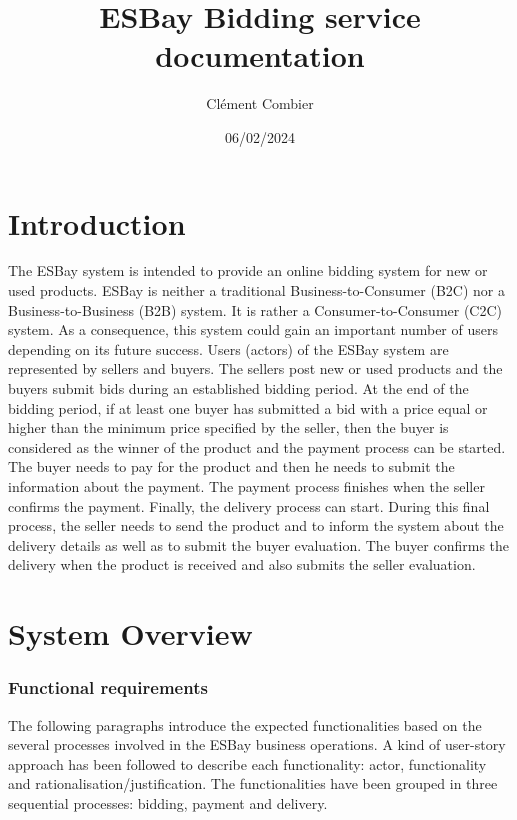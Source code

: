 \documentclass[12pt]{article}
\title{ESBay Bidding service documentation}
\author{Clément Combier}
\date{06/02/2024}
\begin{document}
\maketitle

\section{Introduction}
The ESBay system is intended to provide an online bidding system for new or used products. ESBay is
neither a traditional Business-to-Consumer (B2C) nor a Business-to-Business (B2B) system. It is rather a
Consumer-to-Consumer (C2C) system. As a consequence, this system could gain an important number of users
depending on its future success. Users (actors) of the ESBay system are represented by sellers and buyers. The
sellers post new or used products and the buyers submit bids during an established bidding period. At the end of
the bidding period, if at least one buyer has submitted a bid with a price equal or higher than the minimum price
specified by the seller, then the buyer is considered as the winner of the product and the payment process can be
started. The buyer needs to pay for the product and then he needs to submit the information about the payment.
The payment process finishes when the seller confirms the payment. Finally, the delivery process can start.
During this final process, the seller needs to send the product and to inform the system about the delivery details
as well as to submit the buyer evaluation. The buyer confirms the delivery when the product is received and also
submits the seller evaluation.

\section{System Overview}
\subsubsection{Functional requirements}

The following paragraphs introduce the expected functionalities based on the several processes involved in
the ESBay business operations. A kind of user-story approach has been followed to describe each functionality:
actor, functionality and rationalisation/justification. The functionalities have been grouped in three sequential
processes: bidding, payment and delivery.
\end{document}
